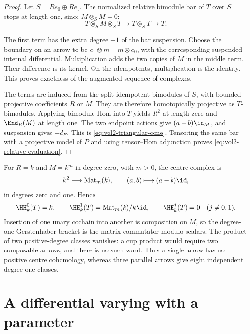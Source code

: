 \begin{proof}
Let $S=Re_0\oplus Re_1$. The normalized relative bimodule bar
of $T$ over $S$ stops at length one, since $M\otimes_SM=0$:
\begin{equation}\label{eq:vol2-short-bar}
 T\otimes_SM\otimes_ST
\longrightarrow T\otimes_ST\longrightarrow T.
\end{equation}

The first term has the extra degree $-1$ of the bar suspension.
Choose the boundary on an arrow to be
$e_1\otimes m-m\otimes e_0$, with the corresponding suspended
internal differential. Multiplication adds the two copies of
$M$ in the middle term. Their difference is its kernel.
On the idempotents, multiplication is the identity.
This proves exactness of the augmented sequence of complexes.

The terms are induced from the split idempotent bimodules of
$S$, with bounded projective coefficients $R$ or $M$.
They are therefore homotopically projective as $T$-bimodules.
Applying bimodule Hom into $T$ yields $R^2$ at length zero
and $\End_R(M)$ at length one. The two endpoint actions give
$(a-b)\id_M$, and suspension gives $-d_E$.
This is \eqref{eq:vol2-triangular-cone}.
Tensoring the same bar with a projective model of $P$ and using
tensor--Hom adjunction proves \eqref{eq:vol2-relative-evaluation}.
\end{proof}

\begin{example}\label{ex:vol2-parallel-arrows}
For $R=k$ and $M=k^m$ in degree zero, with $m>0$, the centre
complex is
\[
 k^2\longrightarrow\operatorname{Mat}_m(k),
 \qquad (a,b)\longmapsto(a-b)\id,
\]
in degrees zero and one. Hence
\[
 \HH_k^0(T)=k,
 \qquad \HH_k^1(T)=\operatorname{Mat}_m(k)/k\id,
 \qquad \HH_k^j(T)=0\quad(j\ne0,1).
\]
Insertion of one unary cochain into another is composition on
$M$, so the degree-one Gerstenhaber bracket is the matrix
commutator modulo scalars. The product of two positive-degree
classes vanishes: a cup product would require two composable
arrows, and there is no such word. Thus a single arrow has no
positive centre cohomology, whereas three parallel arrows give
eight independent degree-one classes.
\end{example}

\section{A differential varying with a parameter}
\label{sec:vol2-varying-centre}

